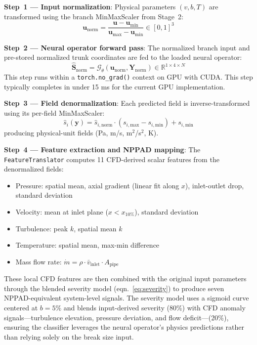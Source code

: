 \documentclass[journal]{IEEEtran}
\begin{document}
\textbf{Step~1 --- Input normalization}: Physical parameters $(v, b, T)$ are transformed using the branch MinMaxScaler from Stage~2:
\begin{equation}
\bm{u}_\text{norm} = \frac{\bm{u} - \bm{u}_\text{min}}{\bm{u}_\text{max} - \bm{u}_\text{min}} \in [0,1]^3
\end{equation}

\textbf{Step~2 --- Neural operator forward pass}: The normalized branch input and pre-stored normalized trunk coordinates are fed to the loaded neural operator:
\begin{equation}
\hat{\bm{S}}_\text{norm} = \mathcal{G}_\theta(\bm{u}_\text{norm}, \bm{Y}_\text{norm}) \in \mathbb{R}^{1 \times 4 \times N}
\end{equation}
This step runs within a \texttt{torch.no\_grad()} context on GPU with CUDA. This step typically completes in under 15 ms for the current GPU implementation.

\textbf{Step~3 --- Field denormalization}: Each predicted field is inverse-transformed using its per-field MinMaxScaler:
\begin{equation}
\hat{s}_i(\bm{y}) = \hat{s}_{i,\text{norm}} \cdot (s_{i,\text{max}} - s_{i,\text{min}}) + s_{i,\text{min}}
\end{equation}
producing physical-unit fields (Pa, m/s, m$^2$/s$^2$, K).

\textbf{Step~4 --- Feature extraction and NPPAD mapping}: The \texttt{FeatureTranslator} computes 11 CFD-derived scalar features from the denormalized fields:
\begin{itemize}
    \item Pressure: spatial mean, axial gradient (linear fit along $x$), inlet-outlet drop, standard deviation
    \item Velocity: mean at inlet plane ($x < x_{10\%}$), standard deviation
    \item Turbulence: peak $k$, spatial mean $k$
    \item Temperature: spatial mean, max-min difference
    \item Mass flow rate: $\dot{m} = \rho \cdot \bar{v}_\text{inlet} \cdot A_\text{pipe}$
\end{itemize}

These local CFD features are then combined with the original input parameters through the blended severity model (eqn.~\ref{eq:severity}) to produce seven NPPAD-equivalent system-level signals. The severity model uses a sigmoid curve centered at $b = 5\%$ and blends input-derived severity (80\%) with CFD anomaly signals---turbulence elevation, pressure deviation, and flow deficit---(20\%), ensuring the classifier leverages the neural operator's physics predictions rather than relying solely on the break size input.
\end{document}
